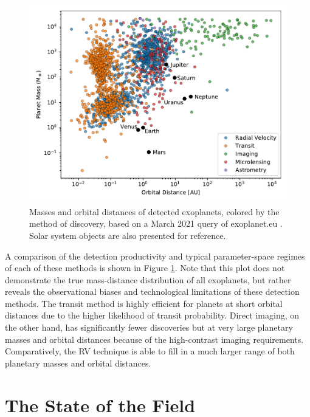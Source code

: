 \begin{figure}
    \centering
    \includegraphics[width=\textwidth]{figures-1/detection-methods.pdf}
    \caption[Mass-distance diagram of discovered exoplanets]{Masses and orbital distances of detected exoplanets, colored by the method of discovery, based on a March 2021 query of exoplanet.eu \citep{schneider_defining_2011}. Solar system objects are also presented for reference.}
    \label{fig:detection-methods}
\end{figure}

A comparison of the detection productivity and typical parameter-space regimes of each of these methods is shown in Figure \ref{fig:detection-methods}. Note that this plot does not demonstrate the true mass-distance distribution of all exoplanets, but rather reveals the observational biases and technological limitations of these detection methods. The transit method is highly efficient for planets at short orbital distances due to the higher likelihood of transit probability. Direct imaging, on the other hand, has significantly fewer discoveries but at very large planetary masses and orbital distances because of the high-contrast imaging requirements. Comparatively, the RV technique is able to fill in a much larger range of both planetary masses and orbital distances.

\section{The State of the Field}

